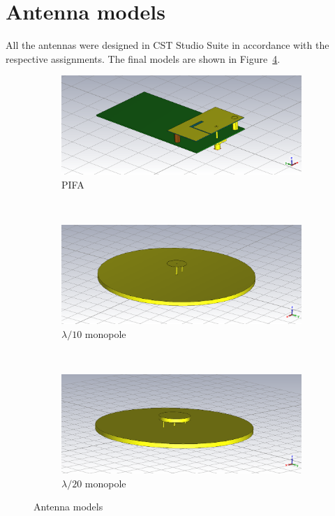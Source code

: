 \documentclass[11pt,a4paper]{article}
\begin{document}
    \section{Antenna models}
        All the antennas were designed in CST Studio Suite in accordance with the respective assignments. The final models are shown in Figure~\ref{fig:antenna-models}.
        \begin{figure}[!ht]
            \centering
            \begin{subfigure}{.8\textwidth}
                \centering
                \includegraphics[width=\textwidth]{src/pifa-model.png}
                \caption{\label{fig:pifa-model}PIFA}
            \end{subfigure}
            \\[.5cm]
            \begin{subfigure}{.8\textwidth}
                \centering
                \includegraphics[width=\textwidth]{src/lambda-tenth-model.png}
                \caption{\label{fig:lambda-tenth-model}$\lambda/10$ monopole}
            \end{subfigure}
            \\[.5cm]
            \begin{subfigure}{.8\textwidth}
                \centering
                \includegraphics[width=\textwidth]{src/lambda-twentieth-model.png}
                \caption{\label{fig:lambda-twentieth-model}$\lambda/20$ monopole}
            \end{subfigure}
            \caption{\label{fig:antenna-models}Antenna models}
        \end{figure}
\end{document}
